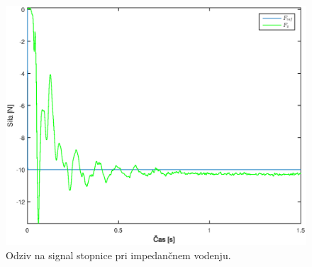 \begin{figure}
	\centering
	\includegraphics[scale=0.5]{./Slike/follow_step_impedance.eps}
	\caption{Odziv na signal stopnice pri impedan\v{c}nem vodenju.}
	\label{fig:follow_step_impedance}
\end{figure}
